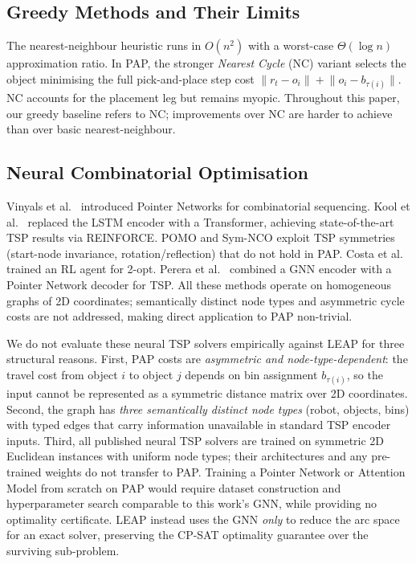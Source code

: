 \documentclass[conference]{IEEEtran}
\begin{document}
\subsection{Greedy Methods and Their Limits}

The nearest-neighbour heuristic \cite{rosenkrantz1977} runs in $O(n^2)$ with a worst-case $\Theta(\log n)$ approximation ratio. In PAP, the stronger \emph{Nearest Cycle} (NC) variant selects the object minimising the full pick-and-place step cost $\lVert r_t - o_i \rVert + \lVert o_i - b_{\tau(i)} \rVert$. NC accounts for the placement leg but remains myopic. Throughout this paper, our greedy baseline refers to NC; improvements over NC are harder to achieve than over basic nearest-neighbour.

\subsection{Neural Combinatorial Optimisation}

Vinyals et al.\ \cite{vinyals2015pointer} introduced Pointer Networks for combinatorial sequencing. Kool et al.\ \cite{kool2019attention} replaced the LSTM encoder with a Transformer, achieving state-of-the-art TSP results via REINFORCE. POMO \cite{kwon2020pomo} and Sym-NCO \cite{kim2022symnco} exploit TSP symmetries (start-node invariance, rotation/reflection) that do not hold in PAP. Costa et al.\ \cite{costa2020learning2opt} trained an RL agent for 2-opt. Perera et al.\ \cite{perera2023gpn} combined a GNN encoder with a Pointer Network decoder for TSP. All these methods operate on homogeneous graphs of 2D coordinates; semantically distinct node types and asymmetric cycle costs are not addressed, making direct application to PAP non-trivial.

We do not evaluate these neural TSP solvers empirically against LEAP for three structural reasons. First, PAP costs are \emph{asymmetric and node-type-dependent}: the travel cost from object $i$ to object $j$ depends on bin assignment $b_{\tau(i)}$, so the input cannot be represented as a symmetric distance matrix over 2D coordinates. Second, the graph has \emph{three semantically distinct node types} (robot, objects, bins) with typed edges that carry information unavailable in standard TSP encoder inputs. Third, all published neural TSP solvers are trained on symmetric 2D Euclidean instances with uniform node types; their architectures and any pre-trained weights do not transfer to PAP. Training a Pointer Network or Attention Model from scratch on PAP would require dataset construction and hyperparameter search comparable to this work's GNN, while providing no optimality certificate. LEAP instead uses the GNN \emph{only} to reduce the arc space for an exact solver, preserving the CP-SAT optimality guarantee over the surviving sub-problem.
\end{document}
